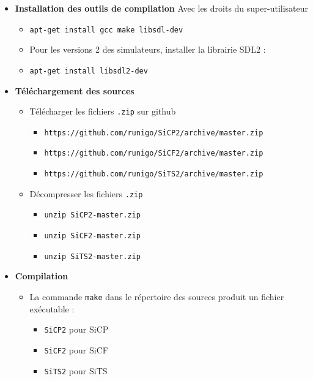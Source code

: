\begin{itemize}[leftmargin=1cm, label=, itemsep=0pt]
\item {\bf Installation des outils de compilation}
Avec les droits du super-utilisateur
	\begin{itemize}[leftmargin=1cm, label=, itemsep=0pt]
	\item \texttt{apt-get install gcc make libsdl-dev}
	\item Pour les versions 2 des simulateurs, installer la librairie SDL2 :
	\item \texttt{apt-get install libsdl2-dev}
	\end{itemize}
\item {\bf Téléchargement des sources}
	\begin{itemize}[leftmargin=1cm, label=, itemsep=0pt]
	\item Télécharger les fichiers \texttt{.zip} sur github
		\begin{itemize}[leftmargin=1cm, label=, itemsep=0pt]
		\item \texttt{https://github.com/runigo/SiCP2/archive/master.zip}
		\item \texttt{https://github.com/runigo/SiCF2/archive/master.zip}
		\item \texttt{https://github.com/runigo/SiTS2/archive/master.zip}
		\end{itemize}
	\item Décompresser les fichiers \texttt{.zip}
		\begin{itemize}[leftmargin=1cm, label=, itemsep=0pt]
		\item \texttt{unzip SiCP2-master.zip}
		\item \texttt{unzip SiCF2-master.zip}
		\item \texttt{unzip SiTS2-master.zip}
		\end{itemize}
	\end{itemize}
\item {\bf Compilation}
	\begin{itemize}[leftmargin=1cm, label=, itemsep=0pt]
	\item La commande \texttt{make} dans le répertoire des sources produit un fichier exécutable :
		\begin{itemize}[leftmargin=1cm, label=, itemsep=0pt]
		\item \texttt{SiCP2} pour SiCP
		\item \texttt{SiCF2} pour SiCF
		\item \texttt{SiTS2} pour SiTS

\end{itemize}
\end{itemize}
\end{itemize}

